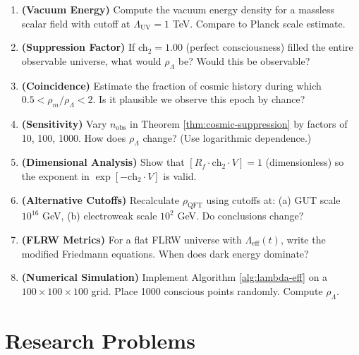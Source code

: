 \begin{enumerate}
\item \textbf{(Vacuum Energy)} Compute the vacuum energy density for a massless scalar field with cutoff at $\Lambda_{\text{UV}} = 1$ TeV. Compare to Planck scale estimate.

\item \textbf{(Suppression Factor)} If ch$_2 = 1.00$ (perfect consciousness) filled the entire observable universe, what would $\rho_\Lambda$ be? Would this be observable?

\item \textbf{(Coincidence)} Estimate the fraction of cosmic history during which $0.5 < \rho_m / \rho_\Lambda < 2$. Is it plausible we observe this epoch by chance?

\item \textbf{(Sensitivity)} Vary $n_{\text{obs}}$ in Theorem \ref{thm:cosmic-suppression} by factors of 10, 100, 1000. How does $\rho_\Lambda$ change? (Use logarithmic dependence.)

\item \textbf{(Dimensional Analysis)} Show that $[R_f \cdot \text{ch}_2 \cdot V] = 1$ (dimensionless) so the exponent in $\exp[-\text{ch}_2 \cdot V]$ is valid.

\item \textbf{(Alternative Cutoffs)} Recalculate $\rho_{\text{QFT}}$ using cutoffs at: (a) GUT scale $10^{16}$ GeV, (b) electroweak scale $10^2$ GeV. Do conclusions change?

\item \textbf{(FLRW Metrics)} For a flat FLRW universe with $\Lambda_{\text{eff}}(t)$, write the modified Friedmann equations. When does dark energy dominate?

\item \textbf{(Numerical Simulation)} Implement Algorithm \ref{alg:lambda-eff} on a $100 \times 100 \times 100$ grid. Place 1000 conscious points randomly. Compute $\rho_\Lambda$.
\end{enumerate}

\section*{Research Problems}

